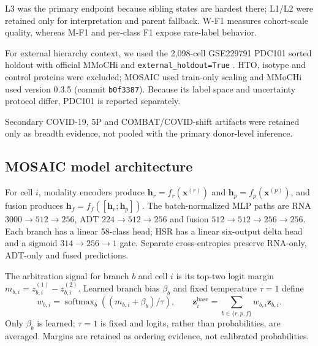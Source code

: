\documentclass[unnumsec,webpdf,contemporary,large,numbered]{oup-authoring-template}
\begin{document}
L3 was the primary endpoint because sibling states are hardest there; L1/L2 were retained only for interpretation and parent fallback. W-F1 measures cohort-scale quality, whereas M-F1 and per-class F1 expose rare-label behavior.

For external hierarchy context, we used the 2,098-cell GSE229791 PDC101 sorted holdout with official MMoCHi and \texttt{external\_holdout=True} \citep{caron2025mmochi}. HTO, isotype and control proteins were excluded; MOSAIC used train-only scaling and MMoCHi used version 0.3.5 (commit \texttt{b0f3387}). Because its label space and uncertainty protocol differ, PDC101 is reported separately.

Secondary COVID-19, 5P and COMBAT/COVID-shift artifacts were retained only as breadth evidence, not pooled with the primary donor-level inference.

\subsection{MOSAIC model architecture}

For cell $i$, modality encoders produce $\mathbf{h}_{r}=f_r(\mathbf{x}^{(r)})$ and $\mathbf{h}_{p}=f_p(\mathbf{x}^{(p)})$, and fusion produces $\mathbf{h}_{f}=f_f([\mathbf{h}_{r};\mathbf{h}_{p}])$. The batch-normalized MLP paths are RNA $3000\!\rightarrow\!512\!\rightarrow\!256$, ADT $224\!\rightarrow\!512\!\rightarrow\!256$ and fusion $512\!\rightarrow\!512\!\rightarrow\!256\!\rightarrow\!256$. Each branch has a linear 58-class head; HSR has a linear six-output delta head and a sigmoid $314\!\rightarrow\!256\!\rightarrow\!1$ gate. Separate cross-entropies preserve RNA-only, ADT-only and fused predictions.

The arbitration signal for branch $b$ and cell $i$ is its top-two logit margin $m_{b,i}=z_{b,i}^{(1)}-z_{b,i}^{(2)}$. Learned branch bias $\beta_b$ and fixed temperature $\tau=1$ define
\begin{equation}
w_{b,i}=\operatorname{softmax}_b((m_{b,i}+\beta_b)/\tau),\qquad
\mathbf{z}^{\mathrm{base}}_i=\sum_{b\in\{r,p,f\}}w_{b,i}\mathbf{z}_{b,i}.
\end{equation}
Only $\beta_b$ is learned; $\tau=1$ is fixed and logits, rather than probabilities, are averaged. Margins are retained as ordering evidence, not calibrated probabilities.
\end{document}
